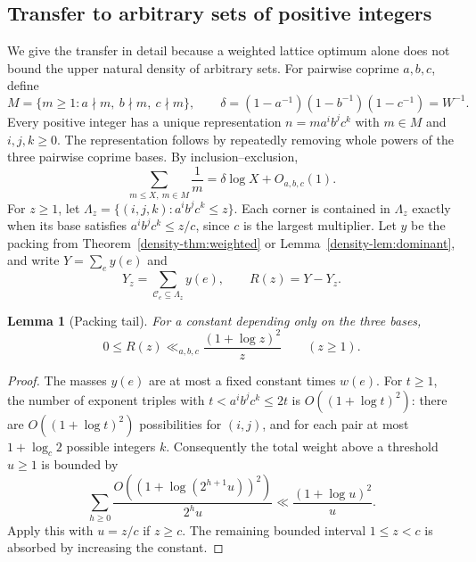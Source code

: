 \documentclass[11pt,a4paper]{article}
\newtheorem{lemma}[theorem]{Lemma}
\theoremstyle{remark}\newtheorem{remark}[theorem]{Remark}
\newcommand{\C}{\mathcal C}
\numberwithin{equation}{section}
\begin{document}
\subsection{Transfer to arbitrary sets of positive integers}
We give the transfer in detail because a weighted lattice optimum
alone does not bound the upper natural density of arbitrary sets.
For pairwise coprime $a,b,c$, define
\[
M=\{m\ge1:a\nmid m,\ b\nmid m,\ c\nmid m\},\qquad
\delta=(1-a^{-1})(1-b^{-1})(1-c^{-1})=W^{-1}.
\]
Every positive integer has a unique representation
$n=ma^ib^jc^k$ with $m\in M$ and $i,j,k\ge0$.
The representation follows by repeatedly removing whole powers of
the three pairwise coprime bases. By inclusion--exclusion,
\begin{equation}\label{density-eq:Mh}
 \sum_{m\le X,\ m\in M}\frac1m=\delta\log X+O_{a,b,c}(1).
\end{equation}
For $z\ge1$, let
$\Lambda_z=\{(i,j,k):a^ib^jc^k\le z\}$.
Each corner is contained in $\Lambda_z$ exactly when its base
satisfies $a^ib^jc^k\le z/c$, since $c$ is the largest multiplier.
Let $y$ be the packing from Theorem~\ref{density-thm:weighted} or
Lemma~\ref{density-lem:dominant}, and write $Y=\sum_e y(e)$ and
\[
Y_z=\sum_{\C_e\subseteq\Lambda_z}y(e),\qquad R(z)=Y-Y_z.
\]

\begin{lemma}[Packing tail]\label{density-lem:tail}
For a constant depending only on the three bases,
\[
0\le R(z)\ll_{a,b,c}\frac{(1+\log z)^2}{z}\qquad(z\ge1).
\]
\end{lemma}
\begin{proof}
The masses $y(e)$ are at most a fixed constant times $w(e)$.
For $t\ge1$, the number of exponent triples with
$t<a^ib^jc^k\le2t$ is $O((1+\log t)^2)$: there are
$O((1+\log t)^2)$ possibilities for $(i,j)$, and for each pair
at most $1+\log_c2$ possible integers $k$.
Consequently the total weight above a threshold $u\ge1$ is bounded
by
\[
\sum_{h\ge0}\frac{O((1+\log(2^{h+1}u))^2)}{2^hu}
\ll\frac{(1+\log u)^2}{u}.
\]
Apply this with $u=z/c$ if $z\ge c$. The remaining bounded interval
$1\le z<c$ is absorbed by increasing the constant.
\end{proof}
\end{document}
